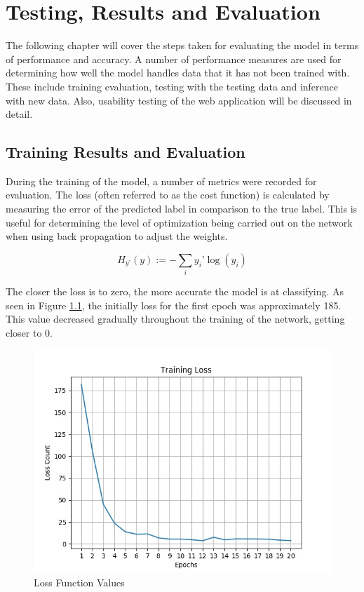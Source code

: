 \chapter{Testing, Results and Evaluation}
The following chapter will cover the steps taken for evaluating the model in terms of performance and accuracy. A number of performance measures are used for determining how well the model handles data that it has not been trained with. These include training evaluation, testing with the testing data and inference with new data. Also, usability testing of the web application will be discussed in detail.

\section{Training Results and Evaluation}
During the training of the model, a number of metrics were recorded for evaluation. The loss (often referred to as the cost function) is calculated by measuring the error of the predicted label in comparison to the true label. This is useful for determining the level of optimization being carried out on the network when using back propagation to adjust the weights.
 
\[H_{y’} (y) := - \sum_{i} y_{i}’ \log (y_i)\]

The closer the loss is to zero, the more accurate the model is at classifying. As seen in Figure \ref{loss}, the initially loss for the first epoch was approximately 185. This value decreased gradually throughout the training of the network, getting closer to 0.

\begin{figure}[ht]
	\begin{center}
		\advance\leftskip-3cm
		\advance\rightskip-3cm
		\includegraphics[keepaspectratio=true,scale=0.7]{__resources/Results/loss.jpg}
		\caption{Loss Function Values}
		\label{loss}
	\end{center}
\end{figure}

